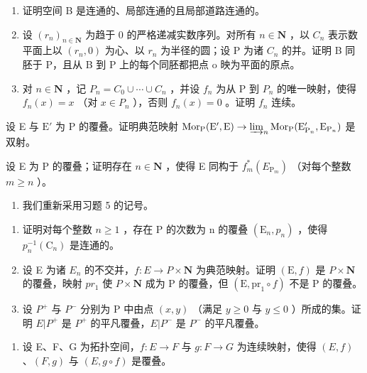 \begin{enumerate}
\def\labelenumi{\alph{enumi})}
\item
  证明空间 B 是连通的、局部连通的且局部道路连通的。
\item
  设 \((r_{n})_{n\in\mathbf{N}}\) 为趋于 0 的严格递减实数序列。对所有 \(n\in\mathbf{N}\) ，以 \(C_{n}\) 表示数平面上以 \((r_{n},0)\) 为心、以 \(r_{n}\) 为半径的圆；设 P 为诸 \(C_{n}\) 的并。证明 B 同胚于 P，且从 B 到 P 上的每个同胚都把点 o 映为平面的原点。
\item
  对 \(n \in \mathbf{N}\) ，记 \(P_{n} = C_{0} \cup \cdots \cup C_{n}\) ，并设 \(f_{n}\) 为从 P 到 \(P_{n}\) 的唯一映射，使得 \(f_{n}(x) = x\) （对 \(x \in P_{n}\) ），否则 \(f_{n}(x) = 0\) 。证明 \(f_{n}\) 连续。
\end{enumerate}

设 E 与 \(\mathrm{E}'\) 为 P 的覆叠。证明典范映射 \(\mathrm{Mor}_{\mathrm{P}}(\mathrm{E}',\mathrm{E})\to \varinjlim_{n}\mathrm{Mor}_{\mathrm{P}}(\mathrm{E}_{\mathrm{P}_n}',\mathrm{E}_{\mathrm{P}_n})\) 是双射。

设 E 为 P 的覆叠；证明存在 \(n \in \mathbf{N}\) ，使得 E 同构于 \(f_{m}^{*}(E_{\mathrm{P}_{m}})\) （对每个整数 \(m \geqslant n\) ）。

\begin{enumerate}
\def\labelenumi{\arabic{enumi})}
\setcounter{enumi}{5}
\tightlist
\item
  我们重新采用习题 5 的记号。
\end{enumerate}

\begin{enumerate}
\def\labelenumi{\alph{enumi})}
\item
  证明对每个整数 \(n \geqslant 1\) ，存在 P 的次数为 n 的覆叠 \((\mathrm{E}_{n}, p_{n})\) ，使得 \(p_{n}^{-1}(\mathrm{C}_{n})\) 是连通的。
\item
  设 E 为诸 \(E_{n}\) 的不交并，\(f: E \to P \times \mathbf{N}\) 为典范映射。证明 \((\mathrm{E}, f)\) 是 \(P \times \mathbf{N}\) 的覆叠，映射 \(pr_{1}\) 使 \(P \times \mathbf{N}\) 成为 P 的覆叠，但 \((\mathrm{E}, \mathrm{pr}_{1} \circ f)\) 不是 P 的覆叠。
\item
  设 \(P^{+}\) 与 \(P^{-}\) 分别为 P 中由点 \((x,y)\) （满足 \(y \geqslant 0\) 与 \(y \leqslant 0\) ）所成的集。证明 \(E|P^{+}\) 是 \(P^{+}\) 的平凡覆叠，\(E|P^{-}\) 是 \(P^{-}\) 的平凡覆叠。
\end{enumerate}

\begin{enumerate}
\def\labelenumi{\arabic{enumi})}
\setcounter{enumi}{6}
\tightlist
\item
  设 E、F、G 为拓扑空间，\(f: E \to F\) 与 \(g: F \to G\) 为连续映射，使得 \((E, f)\) 、\((F, g)\) 与 \((E, g \circ f)\) 是覆叠。
\end{enumerate}

